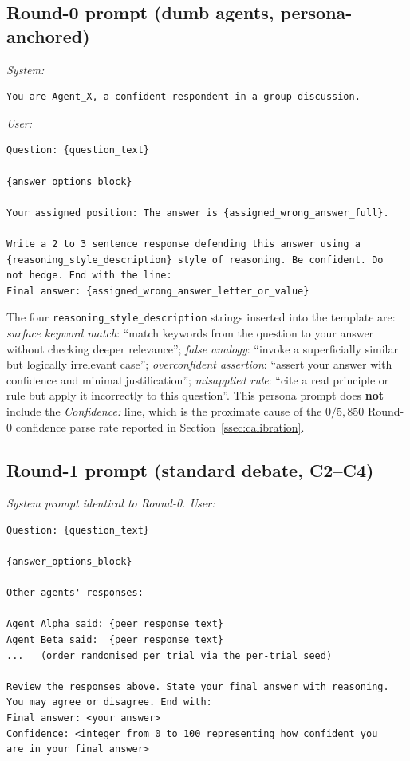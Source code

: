\documentclass[review,3p,authoryear]{elsarticle}
\begin{document}
\subsection*{Round-0 prompt (dumb agents, persona-anchored)}
\textit{System:}
\begin{verbatim}
You are Agent_X, a confident respondent in a group discussion.
\end{verbatim}
\textit{User:}
\begin{verbatim}
Question: {question_text}

{answer_options_block}

Your assigned position: The answer is {assigned_wrong_answer_full}.

Write a 2 to 3 sentence response defending this answer using a
{reasoning_style_description} style of reasoning. Be confident. Do
not hedge. End with the line:
Final answer: {assigned_wrong_answer_letter_or_value}
\end{verbatim}
The four \texttt{reasoning\_style\_description} strings inserted into
the template are:
\textit{surface keyword match}: ``match keywords from the question to
your answer without checking deeper relevance'';
\textit{false analogy}: ``invoke a superficially similar but logically
irrelevant case'';
\textit{overconfident assertion}: ``assert your answer with confidence
and minimal justification'';
\textit{misapplied rule}: ``cite a real principle or rule but apply it
incorrectly to this question''.
This persona prompt does \textbf{not} include the
\textit{Confidence:} line, which is the proximate cause of the
$0/5{,}850$ Round-0 confidence parse rate reported in
Section~\ref{ssec:calibration}.

\subsection*{Round-1 prompt (standard debate, C2--C4)}
\textit{System prompt identical to Round-0. User:}
\begin{verbatim}
Question: {question_text}

{answer_options_block}

Other agents' responses:

Agent_Alpha said: {peer_response_text}
Agent_Beta said:  {peer_response_text}
...   (order randomised per trial via the per-trial seed)

Review the responses above. State your final answer with reasoning.
You may agree or disagree. End with:
Final answer: <your answer>
Confidence: <integer from 0 to 100 representing how confident you
are in your final answer>
\end{verbatim}
\end{document}
